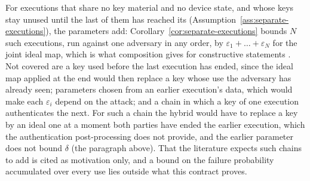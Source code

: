 \begin{remark}
For executions that share no key material and no device state, and whose
keys stay unused until the last of them has reached its
 (Assumption~\ref{ass:separate-executions}), the
parameters add:
Corollary~\ref{cor:separate-executions} bounds $N$ such executions, run
against one adversary in any order, by
$\varepsilon_1+\dots+\varepsilon_N$ for the joint ideal map, which is what
composition gives for constructive statements
\cite[Sec.~II.E]{portmann2022security}. Not covered are a key used before
the last execution has ended, since the ideal map applied at the end would
then replace a key whose use the adversary has already seen; parameters
chosen from an earlier execution's data, which would make each
$\varepsilon_i$ depend on the attack; and a chain in which a key of one
execution authenticates the next. For such a chain the hybrid would have
to replace a key by an ideal one at a moment both parties have ended the
earlier execution, which the authentication post-processing does not
provide, and the earlier parameter does not bound $\delta$ (the paragraph
above). That the literature expects such chains to add
\cite[Sec.~2.3, footnote~2]{tupkary2025survey} is cited as motivation
only, and a bound on the failure probability accumulated over every use
\cite[Sec.~II.F]{portmann2022security} lies outside what this contract
proves.
\end{remark}
